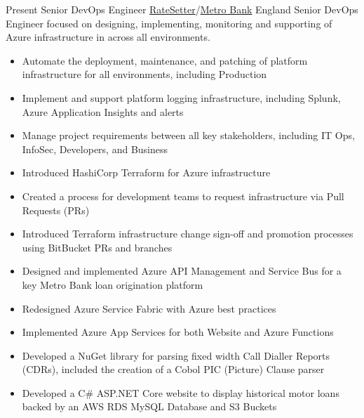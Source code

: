
\begin{twenty}
  {Present}
  {Senior DevOps Engineer}
  {\href{https://www.ratesetter.com/}{RateSetter}/\href{https://metrobankonline.co.uk}{Metro Bank}}
  {England}
  {Senior DevOps Engineer focused on designing, implementing, monitoring and supporting of Azure infrastructure in across all environments.}
  {\begin{itemize}
    \item Automate the deployment, maintenance, and patching of platform infrastructure for all environments, including Production
    \item Implement and support platform logging infrastructure, including Splunk, Azure Application Insights and alerts
    \item Manage project requirements between all key stakeholders, including IT Ops, InfoSec, Developers, and Business
  \end{itemize}}
  {\begin{itemize}
    \item Introduced HashiCorp Terraform for Azure infrastructure
    \item Created a process for development teams to request infrastructure via Pull Requests (PRs)
    \item Introduced Terraform infrastructure change sign-off and promotion processes using BitBucket PRs and branches
    \item Designed and implemented Azure API Management and Service Bus for a key Metro Bank loan origination platform
    \item Redesigned Azure Service Fabric with Azure best practices
    \item Implemented Azure App Services for both Website and Azure Functions
    \item Developed a NuGet library for parsing fixed width Call Dialler Reports (CDRs), included the creation of a Cobol PIC (Picture) Clause parser
    \item Developed a C\# ASP.NET Core website to display historical motor loans backed by an AWS RDS MySQL Database and S3 Buckets
  \end{itemize}
  }
\end{twenty}

